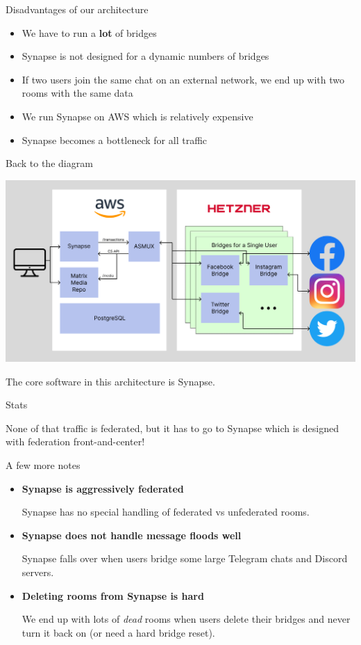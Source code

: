 \documentclass{beeper}
\begin{document}
\begin{frame}{Disadvantages of our architecture}
    \begin{itemize}[<+->]
        \item We have to run a \textbf{lot} of bridges
        \item Synapse is not designed for a dynamic numbers of bridges
        \item If two users join the same chat on an external network, we end up
            with two rooms with the same data
        \item We run Synapse on AWS which is relatively expensive
        \item Synapse becomes a bottleneck for all traffic
    \end{itemize}
\end{frame}

\begin{frame}{Back to the diagram}
    \centerline{\includegraphics[width=1.15\textwidth]{images/current-architecture}}
    The core software in this architecture is Synapse.
\end{frame}

\begin{frame}{Stats}

    None of that traffic is federated, but it has to go to Synapse which is
    designed with federation front-and-center!
\end{frame}

\begin{frame}{A few more notes}
    \begin{itemize}[<+->]
        \item \textbf{Synapse is aggressively federated}

            Synapse has no special handling of federated vs unfederated rooms.

        \item \textbf{Synapse does not handle message floods well}

            Synapse falls over when users bridge some large Telegram chats and
            Discord servers.

        \item \textbf{Deleting rooms from Synapse is hard}

            We end up with lots of \textit{dead} rooms when users delete their
            bridges and never turn it back on (or need a hard bridge reset).
    \end{itemize}
\end{frame}
\end{document}

